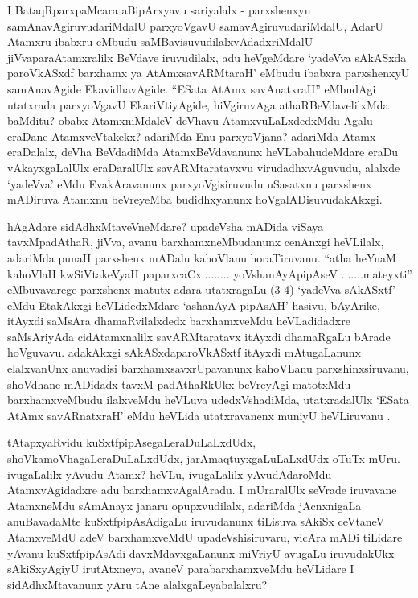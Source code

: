 \begin{artha}
I BataqRparxpaMcara aBipArxyavu sariyalalx - parxshenxyu samAnavAgiruvudariMdalU parxyoVgavU samavAgiruvudariMdalU, AdarU Atamxru ibabxru eMbudu saMBavisuvudilalxvAdadxriMdalU jiVvaparaAtamxralilx BeVdave iruvudilalx, adu heVgeMdare `yadeVva sAkASxda paroVkASxdf barxhamx ya AtAmxsavARMtaraH' eMbudu ibabxra parxshenxyU samAnavAgide EkavidhavAgide. ``ESata AtAmx savAnatxraH'' eMbudAgi utatxrada parxyoVgavU EkariVtiyAgide, hiVgiruvAga athaRBeVdavelilxMda baMditu? obabx AtamxniMdaleV deVhavu AtamxvuLaLxdedxMdu Agalu eraDane AtamxveVtakekx? adariMda Enu parxyoVjana? adariMda Atamx eraDalalx, deVha BeVdadiMda AtamxBeVdavanunx heVLabahudeMdare eraDu vAkayxgaLalUlx eraDaralUlx savARMtaratavxvu virudadhxvAguvudu, alalxde `yadeVva' eMdu EvakAravanunx parxyoVgisiruvudu uSasatxnu parxshenx mADiruva Atamxnu beVreyeMba budidhxyanunx hoVgalADisuvudakAkxgi.
\end{artha}


\begin{artha}
hAgAdare sidAdhxMtaveVneMdare? upadeVsha mADida viSaya tavxMpadAthaR, jiVva, avanu barxhamxneMbudanunx cenAnxgi heVLilalx, adariMda punaH parxshenx mADalu kahoVlanu horaTiruvanu. ``atha heYnaM kahoVlaH kwSiVtakeVyaH paparxcaCx......... yoV\s shanAyApipAseV .......mateyxti'' eMbuvavarege parxshenx matutx adara utatxragaLu (3-4) `yadeVva sAkASxtf' eMdu EtakAkxgi heVLidedxMdare `ashanAyA pipAsAH' hasivu, bAyArike, itAyxdi saMsAra dhamaRvilalxdedx barxhamxveMdu heVLadidadxre saMsAriyAda cidAtamxnalilx savARMtaratavx itAyxdi dhamaRgaLu bArade hoVguvavu. adakAkxgi sAkASxdaparoVkASxtf itAyxdi mAtugaLanunx elalxvanUnx anuvadisi barxhamxsavxrUpavanunx kahoVLanu parxshinxsiruvanu, shoVdhane mADidadx tavxM padAthaRkUkx beVreyAgi matotxMdu barxhamxveMbudu ilalxveMdu heVLuva udedxVshadiMda, utatxradalUlx `ESata AtAmx savARnatxraH' eMdu heVLida utatxravanenx muniyU heVLiruvanu .
\end{artha}

\begin{artha}
tAtapxyaRvidu \mdash  kuSxtfpipAsegaLeraDuLaLxdUdx, shoVkamoVhagaLeraDuLaLxdUdx, jarAmaqtuyxgaLuLaLxdUdx oTuTx mUru. ivugaLalilx yAvudu Atamx? heVLu, ivugaLalilx yAvudAdaroMdu AtamxvAgidadxre adu barxhamxvAgalAradu. I mUraralUlx seVrade iruvavane AtamxneMdu sAmAnayx janaru opupxvudilalx, adariMda jAcnxnigaLa anuBavadaMte kuSxtfpipAsAdigaLu iruvudanunx tiLisuva sAkiSx ceVtaneV AtamxveMdU adeV barxhamxveMdU upadeVshisiruvaru, vicAra mADi tiLidare yAvanu kuSxtfpipAsAdi davxMdavxgaLanunx miVriyU avugaLu iruvudakUkx sAkiSxyAgiyU irutAtxneyo, avaneV parabarxhamxveMdu heVLidare I sidAdhxMtavanunx yAru tAne alalxgaLeyabalalxru?
\end{artha}

